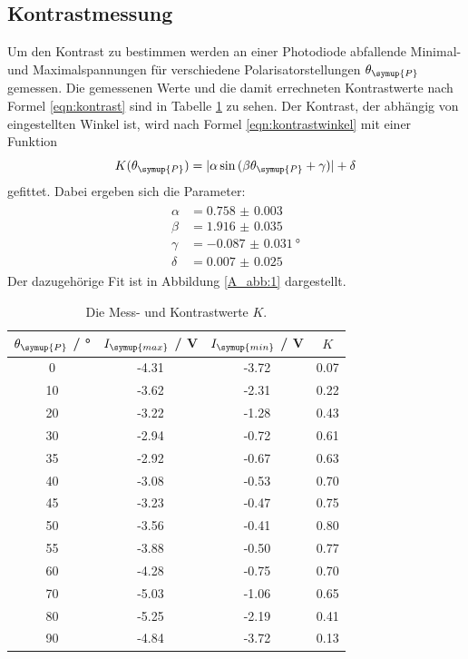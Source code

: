 \documentclass[
  bibliography=totoc,     %
  captions=tableheading,  %
  titlepage=firstiscover, %
]{scrartcl}
\begin{document}
\subsection{Kontrastmessung}
Um den Kontrast zu bestimmen werden an einer Photodiode abfallende
Minimal- und Maximalspannungen für verschiedene Polarisatorstellungen
$\theta_{\symup{P}}$ gemessen. Die gemessenen
Werte und die damit errechneten Kontrastwerte nach Formel \eqref{eqn:kontrast} sind in Tabelle \ref{A_tab:1}
zu sehen.
Der Kontrast, der abhängig von eingestellten Winkel ist, wird nach Formel
\eqref{eqn:kontrastwinkel} mit einer Funktion
\begin{equation}
  K(\theta_{\symup{P}}) = |{\alpha \sin{(\beta \theta_{\symup{P}}+\gamma)}}| + \delta
  \label{A_eqn:1}
\end{equation}
gefittet. Dabei ergeben sich die Parameter:
\begin{align}
\begin{split}
  \alpha &= \num{0.758(3)}\\
  \beta &= \num{1.916(35)}\\
  \gamma &= \SI{-0.087(31)}{\degree} \\
  \delta &= \num{0.007(25)}
\end{split}
\label{A_eqn:2}
\end{align}
Der dazugehörige Fit ist in Abbildung \ref{A_abb:1} dargestellt.
\begin{table}[H]
  \centering
  \caption{Die Mess- und Kontrastwerte $K$.}
  \label{A_tab:1}
  \begin{tabular}{c c c c}
    \toprule
    $\theta_{\symup{P}}$ / \si{\degree} & $I_{\symup{max}}$ / \si{\volt} &
    $I_{\symup{min}}$ / \si{\volt} & $K$\\
    \midrule
    0 & -4.31 & -3.72 & 0.07 \\
    10 & -3.62 & -2.31 & 0.22 \\
    20 & -3.22 & -1.28 & 0.43 \\
    30 & -2.94 & -0.72 & 0.61 \\
    35 & -2.92 & -0.67 & 0.63 \\
    40 & -3.08 & -0.53 & 0.70 \\
    45 & -3.23 & -0.47 & 0.75 \\
    50 & -3.56 & -0.41 & 0.80 \\
    55 & -3.88 & -0.50 & 0.77 \\
    60 & -4.28 & -0.75 & 0.70 \\
    70 & -5.03 & -1.06 & 0.65 \\
    80 & -5.25 & -2.19 & 0.41 \\
    90 & -4.84 & -3.72 & 0.13 \\
    \bottomrule
  \end{tabular}
\end{table}
\end{document}
